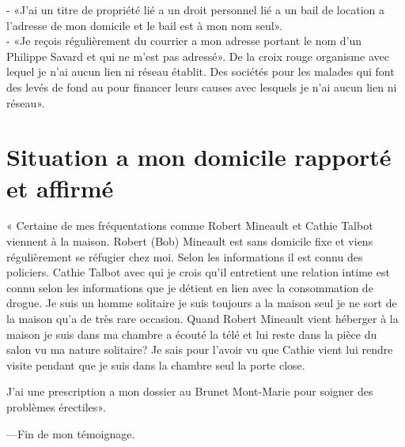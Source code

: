 \documentclass[12pt]{article}
\begin{document}
- «J’ai un titre de propriété lié a un droit personnel lié a un bail de location a l’adresse de mon domicile et le bail est à mon nom seul».\\
- «Je reçois régulièrement du courrier a mon adresse portant le nom d’un Philippe Savard et qui ne m’est pas adressé». De la croix rouge organisme avec lequel je n’ai aucun lien ni réseau établit. Des sociétés pour les malades qui font des levés de fond au pour financer leurs causes avec lesquels je n’ai aucun lien ni réseau».

\section*{Situation a mon domicile rapporté et affirmé}

« Certaine de mes fréquentations comme Robert Mineault et Cathie Talbot viennent à la maison. Robert (Bob) Mineault est sans domicile fixe et viens régulièrement se réfugier chez moi. Selon les informations il est connu des policiers. Cathie Talbot avec qui je crois qu’il entretient une relation intime est connu selon les informations que je détient en lien avec la consommation de drogue. Je suis un homme solitaire je suis toujours a la maison seul je ne sort de la maison qu’a de très rare occasion. Quand Robert Mineault vient héberger à la maison je suis dans ma chambre a écouté la télé et lui reste dans la pièce du salon vu ma nature solitaire? Je sais pour l’avoir vu que Cathie vient lui rendre visite pendant que je suis dans la chambre seul la porte close.

J’ai une prescription a mon dossier au Brunet Mont-Marie pour soigner des problèmes érectiles».

\bigskip
---Fin de mon témoignage.
\end{document}
